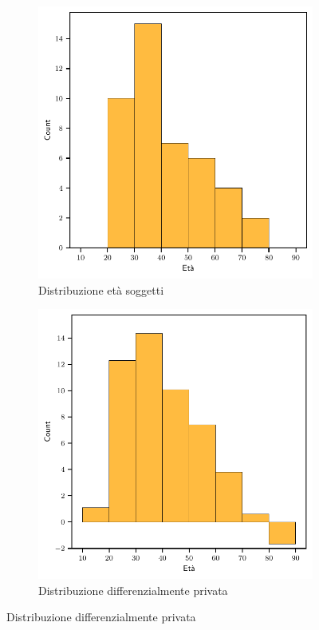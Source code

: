 \begin{figure}[H]
    \begin{subfigure}[t]{.5\textwidth}
        \centering
        \includegraphics[width=.8\linewidth]{plots/age_histogram.pdf}
        \caption{Distribuzione età soggetti}
    \end{subfigure}
    \begin{subfigure}[t]{.5\textwidth}
        \centering
        \includegraphics[width=.8\linewidth]{plots/age_histogram_negative.pdf}
        \caption{Distribuzione differenzialmente privata}
    \end{subfigure}
\end{figure}

